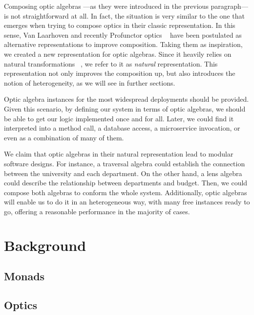 \documentclass[a4paper]{article}
\begin{document}

Composing optic algebras ---as they were introduced in the previous paragraph---
is not straightforward at all. In fact, the situation is very similar to the one
that emerges when trying to compose optics in their classic representation. In
this sense, Van Laarhoven and recently Profunctor optics
~\cite{pickering2017profunctor} have been postulated as alternative
representations to improve composition. Taking them as inspiration, we created a
new representation for optic algebras. Since it heavily relies on natural
transformations ~\cite{pierce1991basic}, we refer to it as \emph{natural}
representation. This representation not only improves the composition up, but
also introduces the notion of heterogeneity, as we will see in further sections.


Optic algebra instances for the most widespread deployments should be provided.
Given this scenario, by defining our system in terms of optic algebras, we
should be able to get our logic implemented once and for all. Later, we could
find it interpreted into a method call, a database access, a microservice
invocation, or even as a combination of many of them.


We claim that optic algebras in their natural representation lead to modular
software designs. For instance, a traversal algebra could establish the
connection between the university and each department. On the other hand, a lens
algebra could describe the relationship between departments and budget. Then, we
could compose both algebras to conform the whole system. Additionally, optic
algebras will enable us to do it in an heterogeneous way, with many free
instances ready to go, offering a reasonable performance in the majority of
cases.

\section{Background}

\subsection{Monads}

\subsection{Optics}
\label{sub:background.optics}
\end{document}

